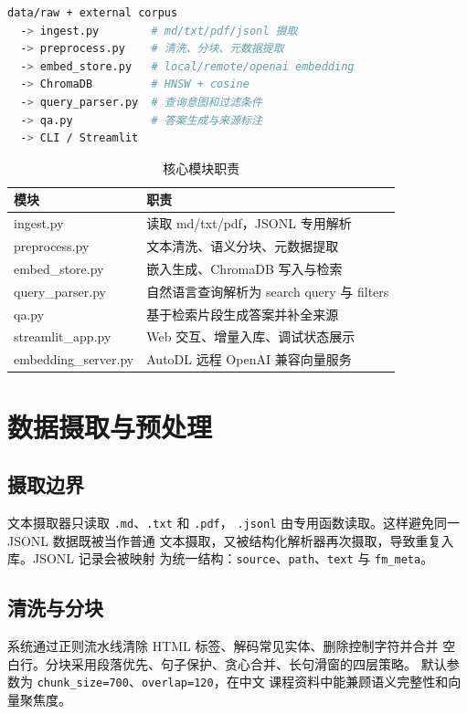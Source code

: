 \documentclass[conference]{IEEEtran}
\begin{document}
\begin{lstlisting}[language=bash,caption={RAG 数据流}]
data/raw + external corpus
  -> ingest.py        # md/txt/pdf/jsonl 摄取
  -> preprocess.py    # 清洗、分块、元数据提取
  -> embed_store.py   # local/remote/openai embedding
  -> ChromaDB         # HNSW + cosine
  -> query_parser.py  # 查询意图和过滤条件
  -> qa.py            # 答案生成与来源标注
  -> CLI / Streamlit
\end{lstlisting}

\begin{table}[!t]
\centering
\caption{核心模块职责}
\label{tab:modules}
\begin{tabular}{@{}ll@{}}
\toprule
\textbf{模块} & \textbf{职责} \\
\midrule
ingest.py & 读取 md/txt/pdf，JSONL 专用解析 \\
preprocess.py & 文本清洗、语义分块、元数据提取 \\
embed\_store.py & 嵌入生成、ChromaDB 写入与检索 \\
query\_parser.py & 自然语言查询解析为 search query 与 filters \\
qa.py & 基于检索片段生成答案并补全来源 \\
streamlit\_app.py & Web 交互、增量入库、调试状态展示 \\
embedding\_server.py & AutoDL 远程 OpenAI 兼容向量服务 \\
\bottomrule
\end{tabular}
\end{table}

\section{数据摄取与预处理}
\subsection{摄取边界}
文本摄取器只读取 \texttt{.md}、\texttt{.txt} 和 \texttt{.pdf}，
\texttt{.jsonl} 由专用函数读取。这样避免同一 JSONL 数据既被当作普通
文本摄取，又被结构化解析器再次摄取，导致重复入库。JSONL 记录会被映射
为统一结构：\texttt{source}、\texttt{path}、\texttt{text} 与
\texttt{fm\_meta}。

\subsection{清洗与分块}
系统通过正则流水线清除 HTML 标签、解码常见实体、删除控制字符并合并
空白行。分块采用段落优先、句子保护、贪心合并、长句滑窗的四层策略。
默认参数为 \texttt{chunk\_size=700}、\texttt{overlap=120}，在中文
课程资料中能兼顾语义完整性和向量聚焦度。
\end{document}
